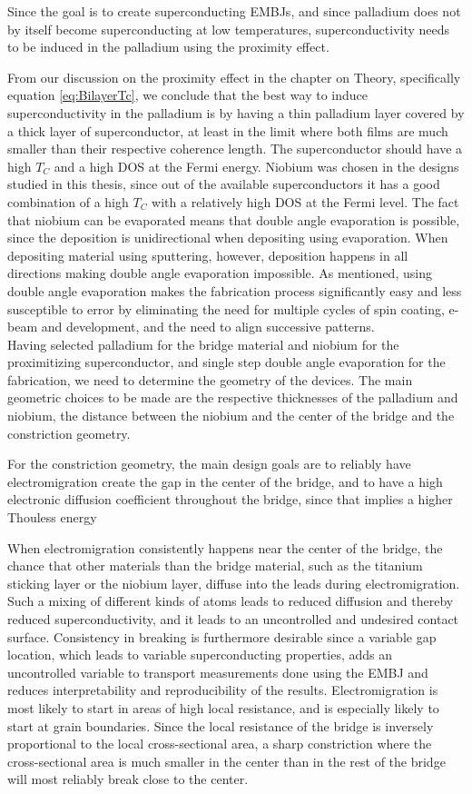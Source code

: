 \noindent Since the goal is to create superconducting EMBJs, and since palladium does not by itself become superconducting at low temperatures, superconductivity needs to be induced in the palladium using the proximity effect. 

From our discussion on the proximity effect in the chapter on Theory, specifically equation \ref{eq:BilayerTc}, we conclude that the best way to induce superconductivity in the palladium is by having a thin palladium layer covered by a thick layer of superconductor, at least in the limit where both films are much smaller than their respective coherence length. The superconductor should have a high $T_C$ and a high DOS at the Fermi energy. Niobium was chosen in the designs studied in this thesis, since out of the available superconductors it has a good combination of a high $T_C$ with a relatively high DOS at the Fermi level. The fact that niobium can be evaporated means that double angle evaporation is possible, since the deposition is unidirectional when depositing using evaporation. When depositing material using sputtering, however, deposition happens in all directions making double angle evaporation impossible. As mentioned, using double angle evaporation makes the fabrication process significantly easy and less susceptible to error by eliminating the need for multiple cycles of spin coating, e-beam and development, and the need to align successive patterns.\\


\noindent Having selected palladium for the bridge material and niobium for the proximitizing superconductor, and single step double angle evaporation for the fabrication, we need to determine the geometry of the devices. The main geometric choices to be made are the respective thicknesses of the palladium and niobium, the distance between the niobium and the center of the bridge and the constriction geometry.

For the constriction geometry, the main design goals are to reliably have electromigration create the gap in the center of the bridge, and to have a high electronic diffusion coefficient throughout the bridge, since that implies a higher Thouless energy

When electromigration consistently happens near the center of the bridge, the chance that other materials than the bridge material, such as the titanium sticking layer or the niobium layer, diffuse into the leads during electromigration. Such a mixing of different kinds of atoms leads to reduced diffusion and thereby reduced superconductivity, and it leads to an uncontrolled and undesired contact surface. Consistency in breaking is furthermore desirable since a variable gap location, which leads to variable superconducting properties, adds an uncontrolled variable to transport measurements done using the EMBJ and reduces interpretability and reproducibility of the results. Electromigration is most likely to start in areas of high local resistance, and is especially likely to start at grain boundaries. Since the local resistance of the bridge is inversely proportional to the local cross-sectional area, a sharp constriction where the cross-sectional area is much smaller in the center than in the rest of the bridge will most reliably break close to the center. 


